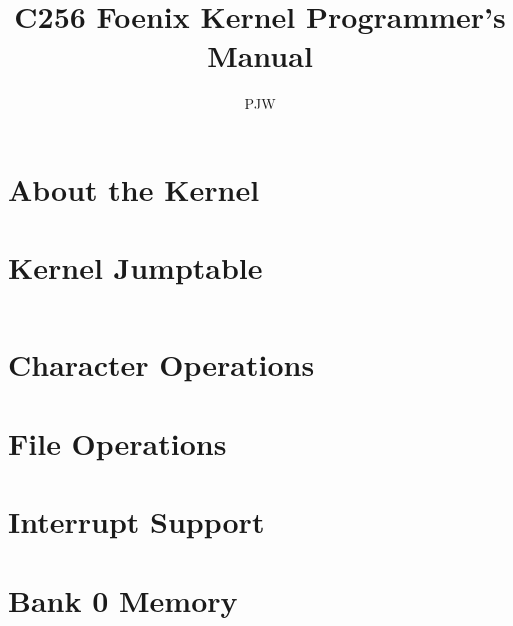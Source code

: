 \documentclass{report}
\begin{document}
    \title{C256 Foenix Kernel Programmer's Manual}
    \author{PJW}
    \maketitle

    \section*{About the Kernel}

    \section*{Kernel Jumptable}

    \begin{tabularx}{\linewidth}{|l|l|X|} \hline
        
    \end{tabularx}

    \section*{Character Operations}

    \section*{File Operations}

    \section*{Interrupt Support}

    \section*{Bank 0 Memory}
    
\end{document}
